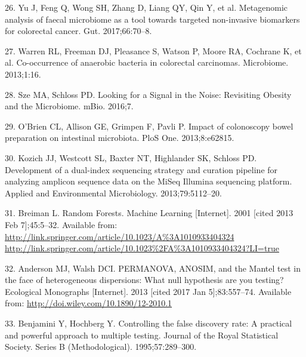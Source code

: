 \documentclass[12pt,]{article}
\begin{document}
\hypertarget{ref-yu_metagenomic_2017}{}
26. Yu J, Feng Q, Wong SH, Zhang D, Liang QY, Qin Y, et al. Metagenomic
analysis of faecal microbiome as a tool towards targeted non-invasive
biomarkers for colorectal cancer. Gut. 2017;66:70--8.

\hypertarget{ref-warren_co-occurrence_2013}{}
27. Warren RL, Freeman DJ, Pleasance S, Watson P, Moore RA, Cochrane K,
et al. Co-occurrence of anaerobic bacteria in colorectal carcinomas.
Microbiome. 2013;1:16.

\hypertarget{ref-sze_looking_2016}{}
28. Sze MA, Schloss PD. Looking for a Signal in the Noise: Revisiting
Obesity and the Microbiome. mBio. 2016;7.

\hypertarget{ref-obrien_impact_2013}{}
29. O'Brien CL, Allison GE, Grimpen F, Pavli P. Impact of colonoscopy
bowel preparation on intestinal microbiota. PloS One. 2013;8:e62815.

\hypertarget{ref-kozich_development_2013}{}
30. Kozich JJ, Westcott SL, Baxter NT, Highlander SK, Schloss PD.
Development of a dual-index sequencing strategy and curation pipeline
for analyzing amplicon sequence data on the MiSeq Illumina sequencing
platform. Applied and Environmental Microbiology. 2013;79:5112--20.

\hypertarget{ref-breiman_random_2001}{}
31. Breiman L. Random Forests. Machine Learning {[}Internet{]}. 2001
{[}cited 2013 Feb 7{]};45:5--32. Available from:
\href{http://link.springer.com/article/10.1023/A\%3A1010933404324\%20http://link.springer.com/article/10.1023\%2FA\%3A1010933404324?LI=true}{http://link.springer.com/article/10.1023/A\%3A1010933404324 http://link.springer.com/article/10.1023\%2FA\%3A1010933404324?LI=true}

\hypertarget{ref-anderson_permanova_2013}{}
32. Anderson MJ, Walsh DCI. PERMANOVA, ANOSIM, and the Mantel test in
the face of heterogeneous dispersions: What null hypothesis are you
testing? Ecological Monographs {[}Internet{]}. 2013 {[}cited 2017 Jan
5{]};83:557--74. Available from:
\url{http://doi.wiley.com/10.1890/12-2010.1}

\hypertarget{ref-benjamini_controlling_1995}{}
33. Benjamini Y, Hochberg Y. Controlling the false discovery rate: A
practical and powerful approach to multiple testing. Journal of the
Royal Statistical Society. Series B (Methodological). 1995;57:289--300.
\end{document}
